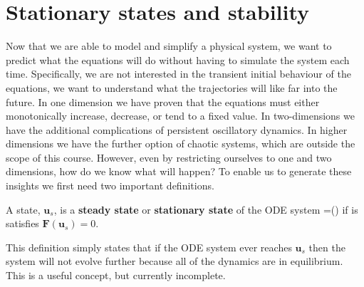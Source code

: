 \chapter{Stationary states and stability}\label{Stationary states and stability}
Now that we are able to model and simplify a physical system, we want to predict what the equations will do without having to simulate the system each time. Specifically, we are not interested in the transient initial behaviour of the equations, we want to understand what the trajectories will like far into the future. In one dimension we have proven that the equations must either monotonically increase, decrease, or tend to a fixed value. In two-dimensions we have the additional complications of persistent oscillatory dynamics. In higher dimensions we have the further option of chaotic systems, which are outside the scope of this course. However, even by restricting ourselves to one and two dimensions, how do we know what will happen? To enable us to generate these insights we first need two important definitions.
\begin{defin}
A state, $\bm{u}_s$, is a \textbf{steady state} or \textbf{stationary state} of the ODE system
\bb
{}=()
\ee
if is satisfies $\bm{F}(\bm{u}_s)=0$.
\end{defin}
This definition simply states that if the ODE system ever reaches $\bm{u}_s$ then the system will not evolve further because all of the dynamics are in equilibrium. This is a useful concept, but currently incomplete.

